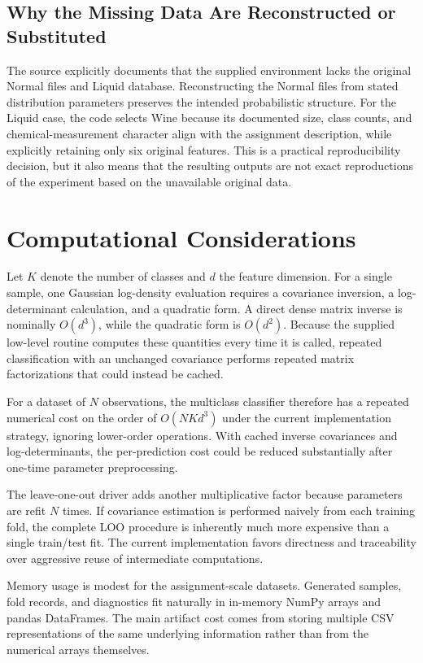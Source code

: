 \documentclass[11pt,a4paper]{article}
\begin{document}
\subsection{Why the Missing Data Are Reconstructed or Substituted}
The source explicitly documents that the supplied environment lacks the original Normal files and Liquid database. Reconstructing the Normal files from stated distribution parameters preserves the intended probabilistic structure. For the Liquid case, the code selects Wine because its documented size, class counts, and chemical-measurement character align with the assignment description, while explicitly retaining only six original features. This is a practical reproducibility decision, but it also means that the resulting outputs are not exact reproductions of the experiment based on the unavailable original data.

\section{Computational Considerations}
Let $K$ denote the number of classes and $d$ the feature dimension. For a single sample, one Gaussian log-density evaluation requires a covariance inversion, a log-determinant calculation, and a quadratic form. A direct dense matrix inverse is nominally $O(d^3)$, while the quadratic form is $O(d^2)$. Because the supplied low-level routine computes these quantities every time it is called, repeated classification with an unchanged covariance performs repeated matrix factorizations that could instead be cached.

For a dataset of $N$ observations, the multiclass classifier therefore has a repeated numerical cost on the order of $O(NKd^3)$ under the current implementation strategy, ignoring lower-order operations. With cached inverse covariances and log-determinants, the per-prediction cost could be reduced substantially after one-time parameter preprocessing.

The leave-one-out driver adds another multiplicative factor because parameters are refit $N$ times. If covariance estimation is performed naively from each training fold, the complete LOO procedure is inherently much more expensive than a single train/test fit. The current implementation favors directness and traceability over aggressive reuse of intermediate computations.

Memory usage is modest for the assignment-scale datasets. Generated samples, fold records, and diagnostics fit naturally in in-memory NumPy arrays and pandas DataFrames. The main artifact cost comes from storing multiple CSV representations of the same underlying information rather than from the numerical arrays themselves.
\end{document}

